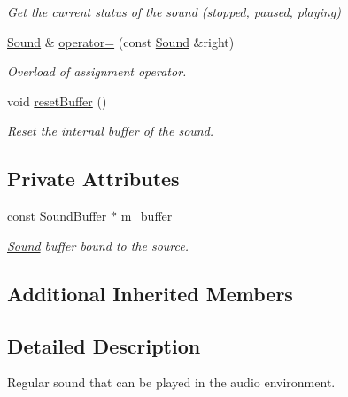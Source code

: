 \begin{DoxyCompactItemize}
\begin{DoxyCompactList}\small\item\em Get the current status of the sound (stopped, paused, playing) \end{DoxyCompactList}\item 
\mbox{\hyperlink{classsf_1_1_sound}{Sound}} \& \mbox{\hyperlink{classsf_1_1_sound_a08c64c9c1dabeebc59fbf2540d81d4dd}{operator=}} (const \mbox{\hyperlink{classsf_1_1_sound}{Sound}} \&right)
\begin{DoxyCompactList}\small\item\em Overload of assignment operator. \end{DoxyCompactList}\item 
void \mbox{\hyperlink{classsf_1_1_sound_acb7289d45e06fb76b8292ac84beb82a7}{reset\+Buffer}} ()
\begin{DoxyCompactList}\small\item\em Reset the internal buffer of the sound. \end{DoxyCompactList}\end{DoxyCompactItemize}
\subsection*{Private Attributes}
\begin{DoxyCompactItemize}
\item 
\mbox{\label{classsf_1_1_sound_a321073271d3b559d491cfc15b0a9dd6d}} 
const \mbox{\hyperlink{classsf_1_1_sound_buffer}{Sound\+Buffer}} $\ast$ \mbox{\hyperlink{classsf_1_1_sound_a321073271d3b559d491cfc15b0a9dd6d}{m\+\_\+buffer}}
\begin{DoxyCompactList}\small\item\em \mbox{\hyperlink{classsf_1_1_sound}{Sound}} buffer bound to the source. \end{DoxyCompactList}\end{DoxyCompactItemize}
\subsection*{Additional Inherited Members}


\subsection{Detailed Description}
Regular sound that can be played in the audio environment. 

\begin{DoxyVerb}\end{DoxyVerb}


